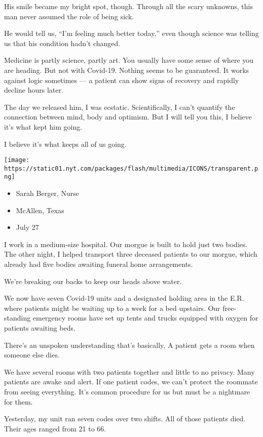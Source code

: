 His smile became my bright spot, though. Through all the scary unknowns,
this man never assumed the role of being sick.

He would tell us, ``I'm feeling much better today,'' even though science
was telling us that his condition hadn't changed.

Medicine is partly science, partly art. You usually have some sense of
where you are heading. But not with Covid-19. Nothing seems to be
guaranteed. It works against logic sometimes --- a patient can show
signs of recovery and rapidly decline hours later.

The day we released him, I was ecstatic. Scientifically, I can't
quantify the connection between mind, body and optimism. But I will tell
you this, I believe it's what kept him going.

I believe it's what keeps all of us going.

\texttt{[image: https://static01.nyt.com/packages/flash/multimedia/ICONS/transparent.png]}

\begin{itemize}
\tightlist
\item
  Sarah Berger, Nurse
\item
  McAllen, Texas
\item
  July 27
\end{itemize}

I work in a medium-size hospital. Our morgue is built to hold just two
bodies. The other night, I helped transport three deceased patients to
our morgue, which already had five bodies awaiting funeral home
arrangements.

We're breaking our backs to keep our heads above water.

We now have seven Covid-19 units and a designated holding area in the
E.R. where patients might be waiting up to a week for a bed upstairs.
Our free-standing emergency rooms have set up tents and trucks equipped
with oxygen for patients awaiting beds.

There's an unspoken understanding that's basically, A patient gets a
room when someone else dies.

We have several rooms with two patients together and little to no
privacy. Many patients are awake and alert. If one patient codes, we
can't protect the roommate from seeing everything. It's common procedure
for us but must be a nightmare for them.

Yesterday, my unit ran seven codes over two shifts. All of those
patients died. Their ages ranged from 21 to 66.

